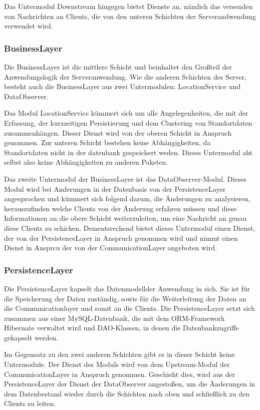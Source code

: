 \documentclass[parskip=full]{scrartcl}
\begin{document}
Das Untermodul Downstream hingegen bietet Dienste an, nämlich das versenden von Nachrichten an Clients, die von den unteren Schichten der Serverandwendung verwendet wird.

\subsubsection{BusinessLayer}
Die BusinessLayer ist die mittlere Schicht und beinhaltet den Großteil der Anwendungslogik der Serveranwendung. Wie die anderen Schichten des Server, besteht auch die BusinessLayer aus zwei Untermodulen: LocationService und DataObserver.

Das Modul LocationService kümmert sich um alle Angelegenheiten, die mit der Erfassung, der kurzzeitigen Persistierung und dem Clustering von Standortdaten zusammenhängen. Dieser Dienst wird von der oberen Schicht in Anspruch genommen. Zur unteren Schicht bestehen keine Abhängigkeiten, da Standortdaten nicht in der datenbank gespeichert weden. Dieses Untermodul aht selbst also keine Abhängigkeiten zu anderen Paketen.

Das zweite Untermodul der BusinessLayer ist das DataObserver-Modul. Dieses Modul wird bei Anderungen in der Datenbasis von der PersistenceLayer angesprochen und kümmert sich folgend darum, die Änderungen zu analysieren, herauszufinden welche Clients von der Änderung erfahren müssen und diese Informationen an die obere Schicht weiterzuleiten, um eine Nachricht an genau diese Clients zu schicken. Dementsrechend bietet dieses Untermodul einen Dienst, der von der PersistenceLayer in Anspruch genommen wird und nimmt einen Dienst in Ansprcu der von der CommunicationLayer angeboten wird.

\subsubsection{PersistenceLayer}
Die PersistenceLayer kapselt das Datenmodellder Anwendung in sich. Sie ist für die Speicherung der Daten zuständig, sowie für die Weiterleitung der Daten an die Communicationlayer und somit an die Clients. Die PersistenceLayer setzt sich zusammen aus einer MySQL-Datenbank, die mit dem ORM-Framework Hibernate verwaltet wird und DAO-Klassen, in denen die Datenbankzugriffe gekapselt werden.

Im Gegensatz zu den zwei anderen Schichten gibt es in dieser Schicht keine Untermodule. Der Dienst des Moduls wird von dem Upstream-Modul der CommunicationLayer in Anspruch genommen. Geschieht dies, wird aus der PersistenceLayer der Dienst der DataObserver angestoßen, um die Änderungen in dem Datenbestand wieder durch die Schichten nach oben und schließlich zu den Clients zu leiten.
\end{document}
